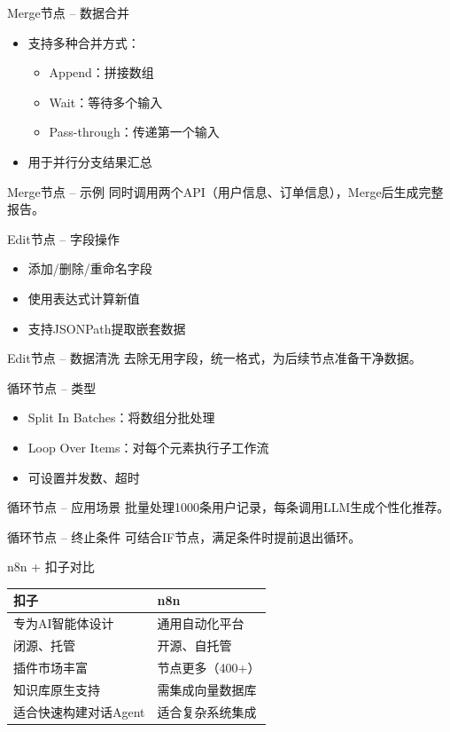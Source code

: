 \begin{frame}{Merge节点 – 数据合并}
\begin{itemize}
\item 支持多种合并方式：
\begin{itemize}
\item Append：拼接数组
\item Wait：等待多个输入
\item Pass-through：传递第一个输入
\end{itemize}
\item 用于并行分支结果汇总
\end{itemize}
\end{frame}
\begin{frame}{Merge节点 – 示例}
同时调用两个API（用户信息、订单信息），Merge后生成完整报告。
\end{frame}

\begin{frame}{Edit节点 – 字段操作}
\begin{itemize}
\item 添加/删除/重命名字段
\item 使用表达式计算新值
\item 支持JSONPath提取嵌套数据
\end{itemize}
\end{frame}
\begin{frame}{Edit节点 – 数据清洗}
去除无用字段，统一格式，为后续节点准备干净数据。
\end{frame}

\begin{frame}{循环节点 – 类型}
\begin{itemize}
\item Split In Batches：将数组分批处理
\item Loop Over Items：对每个元素执行子工作流
\item 可设置并发数、超时
\end{itemize}
\end{frame}
\begin{frame}{循环节点 – 应用场景}
批量处理1000条用户记录，每条调用LLM生成个性化推荐。
\end{frame}
\begin{frame}{循环节点 – 终止条件}
可结合IF节点，满足条件时提前退出循环。
\end{frame}

\begin{frame}{n8n + 扣子对比}
\begin{tabular}{p{}p{}}
\toprule
扣子 & n8n \\
\midrule
专为AI智能体设计 & 通用自动化平台 \\
闭源、托管 & 开源、自托管 \\
插件市场丰富 & 节点更多（400+） \\
知识库原生支持 & 需集成向量数据库 \\
适合快速构建对话Agent & 适合复杂系统集成 \\
\bottomrule
\end{tabular}
\end{frame}

